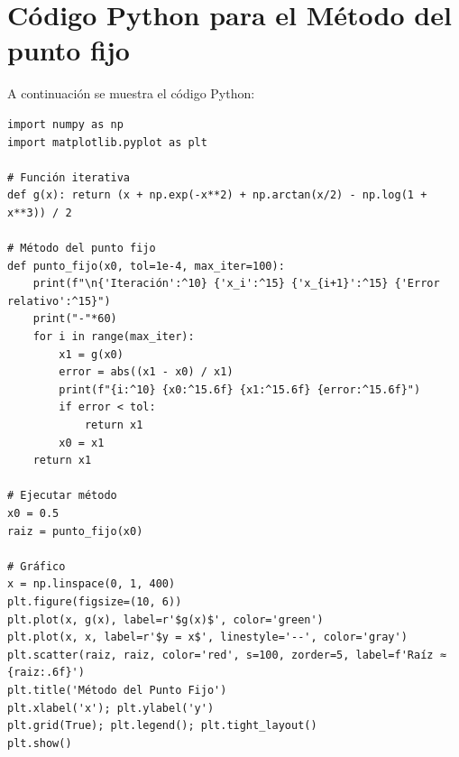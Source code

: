 \documentclass[12pt]{article}
\begin{document}
\begin{center}
\begin{center}
\end{center}

\vspace{1cm}

\section*{Código Python para el Método del punto fijo}

A continuación se muestra el código Python:


\begin{tcolorbox}[title=Método del punto fijo,
                  colback=white,
                  colframe=black,
                  breakable, enhanced]
\begin{lstlisting}[style=mypython]
import numpy as np
import matplotlib.pyplot as plt

# Función iterativa
def g(x): return (x + np.exp(-x**2) + np.arctan(x/2) - np.log(1 + x**3)) / 2

# Método del punto fijo
def punto_fijo(x0, tol=1e-4, max_iter=100):
    print(f"\n{'Iteración':^10} {'x_i':^15} {'x_{i+1}':^15} {'Error relativo':^15}")
    print("-"*60)
    for i in range(max_iter):
        x1 = g(x0)
        error = abs((x1 - x0) / x1)
        print(f"{i:^10} {x0:^15.6f} {x1:^15.6f} {error:^15.6f}")
        if error < tol:
            return x1
        x0 = x1
    return x1

# Ejecutar método
x0 = 0.5
raiz = punto_fijo(x0)

# Gráfico
x = np.linspace(0, 1, 400)
plt.figure(figsize=(10, 6))
plt.plot(x, g(x), label=r'$g(x)$', color='green')
plt.plot(x, x, label=r'$y = x$', linestyle='--', color='gray')
plt.scatter(raiz, raiz, color='red', s=100, zorder=5, label=f'Raíz ≈ {raiz:.6f}')
plt.title('Método del Punto Fijo')
plt.xlabel('x'); plt.ylabel('y')
plt.grid(True); plt.legend(); plt.tight_layout()
plt.show()


\end{lstlisting}
\end{tcolorbox}
\end{center}
\end{document}
